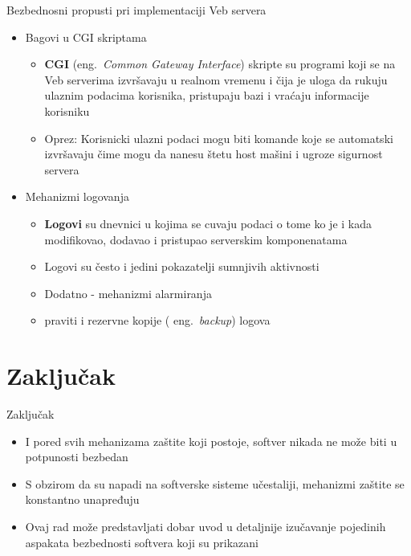 \documentclass{beamer}
\begin{document}
\begin{frame}{Bezbednosni propusti pri implementaciji Veb servera }
    \begin{itemize}
        \item {Bagovi u CGI skriptama 
        \begin{itemize}
            \item  {\textbf{CGI} (eng.~{\em Common Gateway Interface}) skripte su programi koji se na Veb serverima izvršavaju u realnom vremenu i čija je uloga da rukuju ulaznim podacima korisnika, pristupaju bazi i vraćaju informacije korisniku }
            \pause
            \item {Oprez: Korisnicki ulazni podaci mogu biti komande koje se automatski izvršavaju čime mogu da nanesu štetu host mašini i ugroze sigurnost servera}
            \pause
        \end{itemize}
        }
     \item { Mehanizmi logovanja 
        \begin{itemize}
            \item  {\textbf{Logovi } su dnevnici u kojima se cuvaju podaci o tome ko je i kada modifikovao, dodavao i pristupao serverskim komponenatama}\pause
        \item  { 
         Logovi su često i jedini pokazatelji sumnjivih aktivnosti }\pause
         \item{Dodatno - mehanizmi alarmiranja}\pause
         \item{praviti i rezervne kopije ( eng.~{\em  backup}) logova}
        \end{itemize}
        
        }
    \end{itemize}
\end{frame}



\section{Zaključak}

\begin{frame}{Zaključak}
  \begin{itemize}
  \item
   I pored svih mehanizama zaštite koji postoje, softver nikada ne može biti u potpunosti bezbedan 
  \item
        S obzirom da su napadi na softverske sisteme učestaliji, mehanizmi zaštite se konstantno unapređuju 
  \item    
   Ovaj rad može predstavljati dobar uvod u detaljnije izučavanje pojedinih aspakata bezbednosti softvera koji su prikazani
  \end{itemize}
\end{frame}
\end{document}
